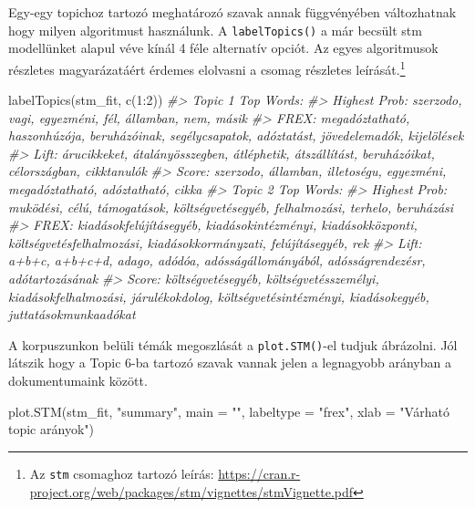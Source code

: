 \documentclass[
]{book}
\newenvironment{Shaded}{\begin{snugshade}}{\end{snugshade}}
\newcommand{\AttributeTok}[1]{\textcolor[rgb]{0.77,0.63,0.00}{#1}}
\newcommand{\CommentTok}[1]{\textcolor[rgb]{0.56,0.35,0.01}{\textit{#1}}}
\newcommand{\DecValTok}[1]{\textcolor[rgb]{0.00,0.00,0.81}{#1}}
\newcommand{\FunctionTok}[1]{\textcolor[rgb]{0.00,0.00,0.00}{#1}}
\newcommand{\NormalTok}[1]{#1}
\newcommand{\SpecialCharTok}[1]{\textcolor[rgb]{0.00,0.00,0.00}{#1}}
\newcommand{\StringTok}[1]{\textcolor[rgb]{0.31,0.60,0.02}{#1}}
\begin{document}
Egy-egy topichoz tartozó meghatározó szavak annak függvényében
változhatnak hogy milyen algoritmust használunk. A
\texttt{labelTopics()} a már becsült stm modellünket alapul véve kínál 4
féle alternatív opciót. Az egyes algoritmusok részletes magyarázatáért
érdemes elolvasni a csomag részletes leírását.\footnote{Az \texttt{stm}
  csomaghoz tartozó leírás:
  \url{https://cran.r-project.org/web/packages/stm/vignettes/stmVignette.pdf}}

\begin{Shaded}
\begin{Highlighting}[]
\FunctionTok{labelTopics}\NormalTok{(stm\_fit, }\FunctionTok{c}\NormalTok{(}\DecValTok{1}\SpecialCharTok{:}\DecValTok{2}\NormalTok{))}
\CommentTok{\#\textgreater{} Topic 1 Top Words:}
\CommentTok{\#\textgreater{}       Highest Prob: szerzodo, vagi, egyezméni, fél, államban, nem, másik }
\CommentTok{\#\textgreater{}       FREX: megadóztatható, haszonhúzója, beruházóinak, segélycsapatok, adóztatást, jövedelemadók, kijelölések }
\CommentTok{\#\textgreater{}       Lift: árucikkeket, átalányösszegben, átléphetik, átszállítást, beruházóikat, célországban, cikktanulók }
\CommentTok{\#\textgreater{}       Score: szerzodo, államban, illetoségu, egyezméni, megadóztatható, adóztatható, cikka }
\CommentTok{\#\textgreater{} Topic 2 Top Words:}
\CommentTok{\#\textgreater{}       Highest Prob: muködési, célú, támogatások, költségvetésegyéb, felhalmozási, terhelo, beruházási }
\CommentTok{\#\textgreater{}       FREX: kiadásokfelújításegyéb, kiadásokintézményi, kiadásokközponti, költségvetésfelhalmozási, kiadásokkormányzati, felújításegyéb, rek }
\CommentTok{\#\textgreater{}       Lift: a+b+c, a+b+c+d, adago, adódóa, adósságállományából, adósságrendezésr, adótartozásának }
\CommentTok{\#\textgreater{}       Score: költségvetésegyéb, költségvetésszemélyi, kiadásokfelhalmozási, járulékokdolog, költségvetésintézményi, kiadásokegyéb, juttatásokmunkaadókat}
\end{Highlighting}
\end{Shaded}

A korpuszunkon belüli témák megoszlását a \texttt{plot.STM()}-el tudjuk
ábrázolni. Jól látszik hogy a Topic 6-ba tartozó szavak vannak jelen a
legnagyobb arányban a dokumentumaink között.

\begin{Shaded}
\begin{Highlighting}[]
\FunctionTok{plot.STM}\NormalTok{(stm\_fit, }\StringTok{"summary"}\NormalTok{, }\AttributeTok{main =} \StringTok{""}\NormalTok{, }\AttributeTok{labeltype =} \StringTok{"frex"}\NormalTok{, }\AttributeTok{xlab =} \StringTok{"Várható topic arányok"}\NormalTok{)}
\end{Highlighting}
\end{Shaded}
\end{document}
